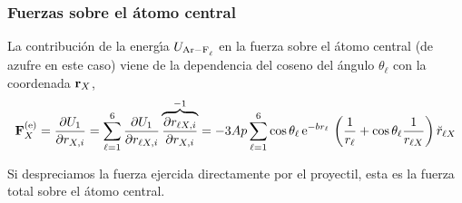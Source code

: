\begin{subappendices}
\subsubsection{Fuerzas sobre el \'{a}tomo central}

La contribuci\'{o}n de la energ\'{\i}a $U_{\ce{Ar-F_{\ell}}}$ en la fuerza sobre el \'{a}tomo central (de azufre en este caso) viene de la dependencia del coseno del \'{a}ngulo $\theta_{\ell}$ con la coordenada $\mathbf{r}_{X}$,
\begin{equation}
  \label{Q:pot-inter-fuerza-S}
  \mathbf{F}^{\text{(e)}}_{X} = \frac{\partial U_{1}}{\partial r_{X,i}} = \sum_{\ell=1}^{6} \frac{\partial U_{1}}{\partial r_{\ell X,i}} \overbrace{ \frac{\partial r_{\ell X,i}}{\partial r_{X,i}}}^{-1} = - 3 A p \sum_{\ell=1}^{6} \cos \theta_{\ell}\, \mathrm{e}^{-b r_{\ell}} \,  \left( \frac{1}{r_{\ell}} + \cos \theta_{\ell}\frac{1}{r_{\ell X}} \right) \breve{r}_{\ell X} 
\end{equation}

Si despreciamos la fuerza ejercida directamente por el proyectil, esta es la fuerza total sobre el \'{a}tomo central.

\end{subappendices}

